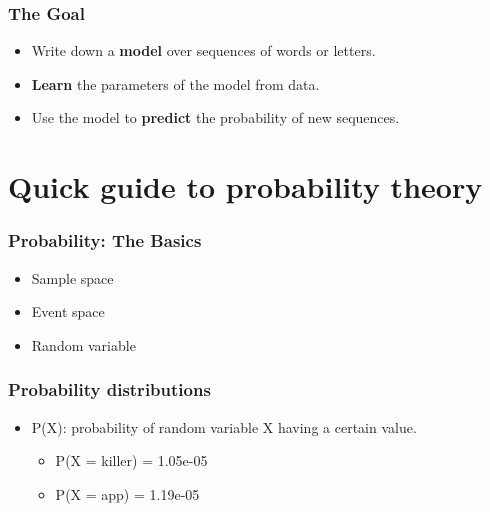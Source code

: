 \begin{frame}
\frametitle{The Goal}
\begin{itemize}[<+->]
\item Write down a \textbf{model} over sequences of words or letters.
\item \textbf{Learn} the parameters of the model from data.
\item Use the model to \textbf{predict} the probability of new sequences.
\end{itemize}
\end{frame}


\section{Quick guide to probability theory}
\frame{\tableofcontents[currentsection]}

\begin{frame}
\frametitle{Probability: The Basics}
\begin{itemize}[<+->]
\item Sample space
\item Event space
\item Random variable
\end{itemize}
\end{frame}

\begin{frame}
\frametitle{Probability distributions}
\begin{itemize}[<+->]
\item P(X): probability of random variable X having a certain value.
\begin{itemize}[<+->]
\item P(X = killer) = 1.05e-05 
\item P(X = app) = 1.19e-05
\end{itemize}
\end{itemize}
\end{frame}



